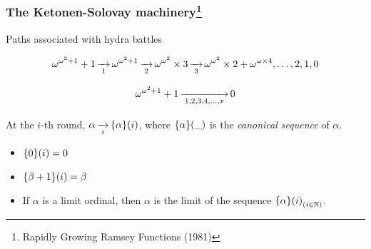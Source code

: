 \documentclass[10pt, fleqn]{beamer}
\begin{document}
\begin{frame}
  \frametitle{The Ketonen-Solovay machinery\footnote{Rapidly Growing {R}amsey Functions (1981)}}
    \begin{block}{Paths associated with hydra battles}
      {\color{mathcolor}
      $$\omega^{\omega^2+1}+1 \rplus{1} \omega^{\omega^2+1}
      \rplus{2} \omega^{\omega^2}\times 3 
      \rplus{3} \omega^{\omega^2}\times 2 +
      \omega ^ {\omega \times 4}, \dots,2,1,0$$

      \vspace{6pt}
      
      $$ \omega^{\omega^2+1}+1 \rplus{1,2,3,4,\dots,x} 0$$}
    \end{block}
    
      \begin{block}{}
        At the $i$-th round, 
           \textcolor{mathcolor}{$\alpha \rplus{i} \canonseq{\alpha}{i}$},
           where \textcolor{mathcolor}{$\mbox{$\{\alpha\}(\_)$}$} is the \emph{canonical sequence} of \textcolor{mathcolor}{$\alpha$}.
          
             \begin{itemize}
             \item  \textcolor{mathcolor}{$\mbox{$\{0\}(i)$}=0$}
             \item \textcolor{mathcolor}{$\mbox{$\{\beta+1\}(i)$}=\beta$}
             \item If \textcolor{mathcolor}{$\alpha$} is a limit ordinal, then \textcolor{mathcolor}{$\alpha$} is the limit of the sequence
               \textcolor{mathcolor}{$\mbox{$\{\alpha\}(i)$}_{ (i\in\mathbb{N})}$}.
             \end{itemize}
           \end{block}
  
    
    
 
   
 
  \end{frame}
\end{document}
